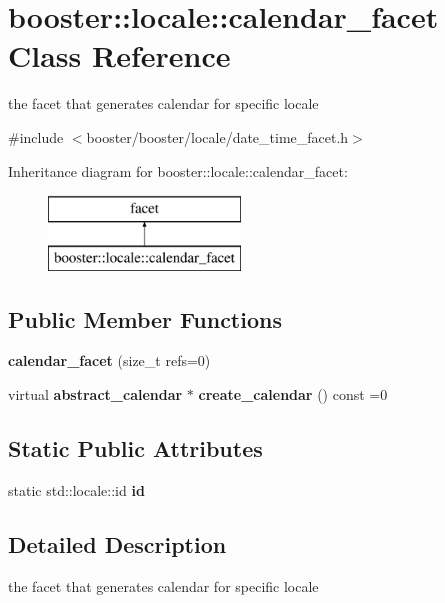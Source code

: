 \section{booster\+:\+:locale\+:\+:calendar\+\_\+facet Class Reference}
\label{classbooster_1_1locale_1_1calendar__facet}


the facet that generates calendar for specific locale  




{\ttfamily \#include $<$booster/booster/locale/date\+\_\+time\+\_\+facet.\+h$>$}

Inheritance diagram for booster\+:\+:locale\+:\+:calendar\+\_\+facet\+:\begin{figure}[H]
\begin{center}
\leavevmode
\includegraphics[height=2.000000cm]{classbooster_1_1locale_1_1calendar__facet}
\end{center}
\end{figure}
\subsection*{Public Member Functions}
\begin{DoxyCompactItemize}
\item 
{\bf calendar\+\_\+facet} (size\+\_\+t refs=0)
\item 
virtual {\bf abstract\+\_\+calendar} $\ast$ {\bf create\+\_\+calendar} () const =0
\end{DoxyCompactItemize}
\subsection*{Static Public Attributes}
\begin{DoxyCompactItemize}
\item 
static std\+::locale\+::id {\bf id}
\end{DoxyCompactItemize}


\subsection{Detailed Description}
the facet that generates calendar for specific locale 

